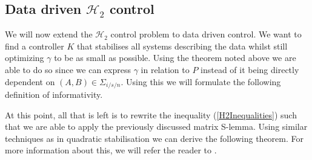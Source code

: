 


\subsection{Data driven $\mathcal{H}_2$ control}
We will now extend the $\mathcal{H}_2$ control problem to data driven control. We want to find a controller $K$ that stabilises all systems describing the data whilst still optimizing $\gamma$ to be as small as possible. Using the theorem noted above we are able to do so since we can express $\gamma$ in relation to $P$ instead of it being directly dependent on $(A,B) \in \Sigma_{i/s/n}$. Using this we will formulate the following definition of informativity.


At this point, all that is left is to rewrite the inequality (\ref{H2Inequalities}) such that we are able to apply the previously discussed matrix S-lemma. Using similar techniques as in quadratic stabilisation we can derive the following theorem. For more information about this, we will refer the reader to \cite[Section V.A]{waarde2020noisy}.



